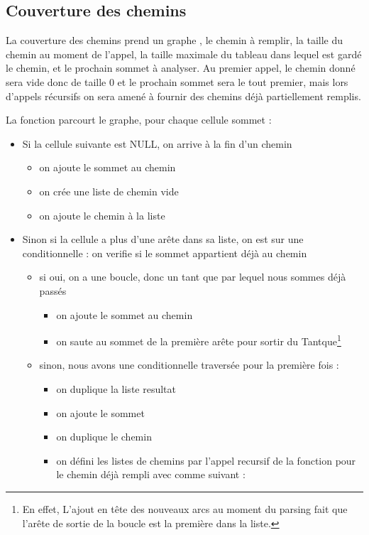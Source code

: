 \documentclass[a4paper,11pt]{article}
\begin{document}
	\subsection{Couverture des chemins}
		La couverture des chemins prend un graphe , le chemin à remplir, la taille du chemin au moment de l'appel, la taille maximale du tableau dans lequel est gardé le chemin, et le prochain sommet à analyser. Au premier appel, le chemin donné sera vide donc de taille 0 et le prochain sommet sera le tout premier, mais lors d'appels récursifs on sera amené à fournir des chemins déjà partiellement remplis.

		La fonction parcourt le graphe, pour chaque cellule sommet :
	\begin{itemize}
	\item Si la cellule suivante est NULL, on arrive à la fin d'un chemin
		\begin{itemize}
		\item on ajoute le sommet au chemin
		\item on crée une liste de chemin vide
		\item on ajoute le chemin à la liste
		\end{itemize}
	\item Sinon si la cellule a plus d'une arête dans sa liste, on est sur une conditionnelle : on verifie si le sommet appartient déjà au chemin
			\begin{itemize}
			\item si oui, on a une boucle, donc un tant que par lequel nous sommes déjà passés
				\begin{itemize}
				\item on ajoute le sommet au chemin
				\item on saute au sommet de la première arête pour sortir du Tantque\footnote{En effet, L'ajout en tête des nouveaux arcs au moment du parsing fait que l'arête de sortie de la boucle est la première dans la liste.}
				\end{itemize}
			\item sinon, nous avons une conditionnelle traversée pour la première fois :
				\begin{itemize}
				\item on duplique la liste resultat
				\item on ajoute le sommet
				\item on duplique le chemin
				\item on défini les listes de chemins par l'appel recursif de la fonction pour le chemin déjà rempli avec comme suivant :

\end{itemize}
\end{itemize}
\end{itemize}
\end{document}
